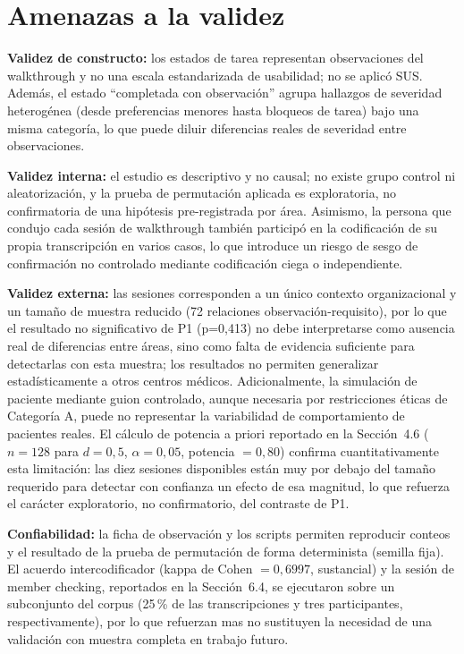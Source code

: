 \documentclass[runningheads]{llncs}
\begin{document}
	\section{Amenazas a la validez}\label{sec:amenazas}
	\textbf{Validez de constructo:} los estados de tarea representan observaciones del walkthrough y no una escala estandarizada de usabilidad; no se aplicó SUS. Además, el estado ``completada con observación'' agrupa hallazgos de severidad heterogénea (desde preferencias menores hasta bloqueos de tarea) bajo una misma categoría, lo que puede diluir diferencias reales de severidad entre observaciones.
	
	\textbf{Validez interna:} el estudio es descriptivo y no causal; no existe grupo control ni aleatorización, y la prueba de permutación aplicada es exploratoria, no confirmatoria de una hipótesis pre-registrada por área. Asimismo, la persona que condujo cada sesión de walkthrough también participó en la codificación de su propia transcripción en varios casos, lo que introduce un riesgo de sesgo de confirmación no controlado mediante codificación ciega o independiente.
	
	\textbf{Validez externa:} las sesiones corresponden a un único contexto organizacional y un tamaño de muestra reducido (72 relaciones observación-requisito), por lo que el resultado no significativo de P1 (p=0,413) no debe interpretarse como ausencia real de diferencias entre áreas, sino como falta de evidencia suficiente para detectarlas con esta muestra; los resultados no permiten generalizar estadísticamente a otros centros médicos. Adicionalmente, la simulación de paciente mediante guion controlado, aunque necesaria por restricciones éticas de Categoría A, puede no representar la variabilidad de comportamiento de pacientes reales. El cálculo de potencia a priori reportado en la Sección~4.6 ($n=128$ para $d=0{,}5$, $\alpha=0{,}05$, potencia $=0{,}80$) confirma cuantitativamente esta limitación: las diez sesiones disponibles están muy por debajo del tamaño requerido para detectar con confianza un efecto de esa magnitud, lo que refuerza el carácter exploratorio, no confirmatorio, del contraste de P1.
	
	\textbf{Confiabilidad:} la ficha de observación y los scripts permiten reproducir conteos y el resultado de la prueba de permutación de forma determinista (semilla fija). El acuerdo intercodificador (kappa de Cohen $=0{,}6997$, sustancial) y la sesión de member checking, reportados en la Sección~6.4, se ejecutaron sobre un subconjunto del corpus (25\,\% de las transcripciones y tres participantes, respectivamente), por lo que refuerzan mas no sustituyen la necesidad de una validación con muestra completa en trabajo futuro.
	
\end{document}
